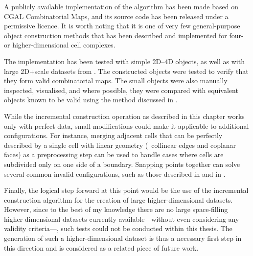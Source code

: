 A publicly available implementation of the algorithm has been made based on CGAL Combinatorial Maps, and its source code has been released under a permissive licence.
It is worth noting that it is one of very few general-purpose object construction methods that has been described and implemented for four- or higher-dimensional cell complexes.

The implementation has been tested with simple 2D--4D objects, as well as with large 2D+scale datasets from \citet{Meijers11}.
The constructed objects were tested to verify that they form valid combinatorial maps.
The small objects were also manually inspected, visualised, and where possible, they were compared with equivalent objects known to be valid using the method discussed in .

While the incremental construction operation as described in this chapter works only with perfect data, small modifications could make it applicable to additional configurations.
For instance, merging adjacent cells that can be perfectly described by a single cell with linear geometry (\eg\ collinear edges and coplanar faces) as a preprocessing step can be used to handle cases where cells are subdivided only on one side of a boundary.
Snapping points together can solve several common invalid configurations, such as those described in  and in \citet{Diakite14}.

Finally, the logical step forward at this point would be the use of the incremental construction algorithm for the creation of large higher-dimensional datasets.
However, since to the best of my knowledge there are no large space-filling higher-dimensional datasets currently available---without even considering any validity criteria---, such tests could not be conducted within this thesis.
The generation of such a higher-dimensional dataset is thus a necessary first step in this direction and is considered as a related piece of future work.
